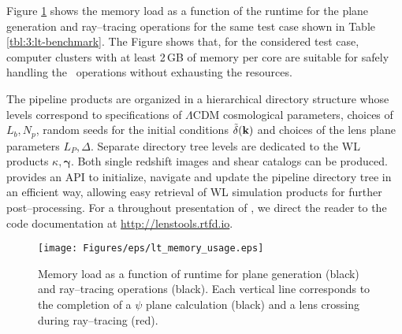 %
Figure \ref{fig:3:lt-memory} shows the memory load as a function of the runtime for the plane generation and ray--tracing operations for the same test case shown in Table \ref{tbl:3:lt-benchmark}. The Figure shows that, for the considered test case, computer clusters with at least 2\,GB of memory per core are suitable for safely handling the \LT\, operations without exhausting the resources. 

The pipeline products are organized in a hierarchical directory structure whose levels correspond to specifications of $\Lambda$CDM cosmological parameters, choices of $L_b,N_p$, random seeds for the initial conditions $\tilde{\delta}(\mathbf{k})$ and choices of the lens plane parameters $L_P,\Delta$. Separate directory tree levels are dedicated to the WL products $\kappa,\pmb{\gamma}$. Both single redshift images and shear catalogs can be produced. \LT\, provides an API to initialize, navigate and update the pipeline directory tree in an efficient way, allowing easy retrieval of WL simulation products for further post--processing. For a throughout presentation of \LT, we direct the reader to the code documentation at \url{http://lenstools.rtfd.io}. 
\begin{figure}
\begin{center}
\texttt{[image: Figures/eps/lt\_memory\_usage.eps]}
\end{center}
\caption{Memory load as a function of runtime for plane generation (black) and ray--tracing operations (black). Each vertical line corresponds to the completion of a $\psi$ plane calculation (black) and a lens crossing during ray--tracing (red).}
\label{fig:3:lt-memory}
\end{figure}
    

%